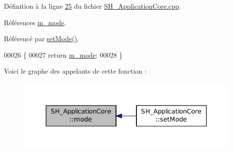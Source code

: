 Définition à la ligne \hyperlink{SH__ApplicationCore_8cpp_source_l00025}{25} du fichier \hyperlink{SH__ApplicationCore_8cpp_source}{S\-H\-\_\-\-Application\-Core.\-cpp}.



Références \hyperlink{classSH__ApplicationCore_ac9587a451ab2294abe7a9eb738d93cb0}{m\-\_\-mode}.



Référencé par \hyperlink{classSH__ApplicationCore_aeb87d289ccc9c8209928f23cf8a02ead}{set\-Mode()}.


\begin{DoxyCode}
00026 \{
00027     \textcolor{keywordflow}{return} \hyperlink{classSH__ApplicationCore_ac9587a451ab2294abe7a9eb738d93cb0}{m\_mode};
00028 \}
\end{DoxyCode}


Voici le graphe des appelants de cette fonction \-:\nopagebreak
\begin{figure}[H]
\begin{center}
\leavevmode
\includegraphics[width=350pt]{classSH__ApplicationCore_a210295d4d7a6e16e9def6e0a29816b51_icgraph}
\end{center}
\end{figure}


